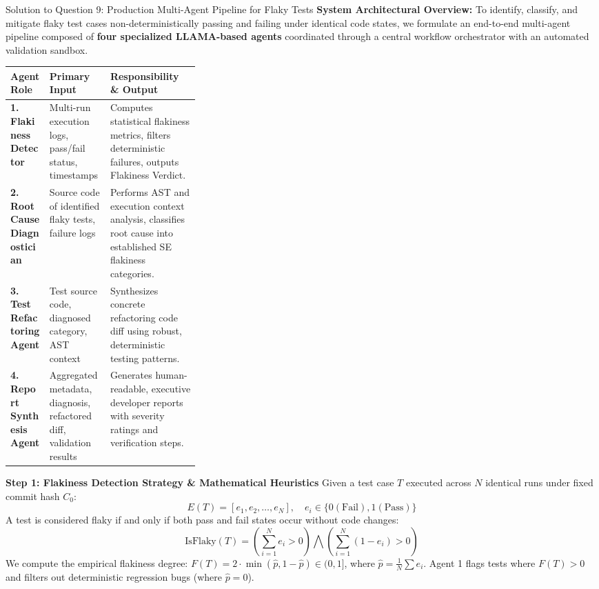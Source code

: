 \documentclass[11pt,a4paper]{article}
\begin{document}
\begin{solutionbox}{Solution to Question 9: Production Multi-Agent Pipeline for Flaky Tests}
\textbf{System Architectural Overview:}
To identify, classify, and mitigate flaky test cases non-deterministically passing and failing under identical code states, we formulate an end-to-end multi-agent pipeline composed of \textbf{four specialized LLAMA-based agents} coordinated through a central workflow orchestrator with an automated validation sandbox.

\begin{center}
\small
\begin{tabularx}{\linewidth}{l >{\raggedright\arraybackslash}p{0.32\linewidth} >{\raggedright\arraybackslash}X}
\toprule
\textbf{Agent Role} & \textbf{Primary Input} & \textbf{Responsibility \& Output} \\
\midrule
\textbf{1. Flakiness Detector} & Multi-run execution logs, pass/fail status, timestamps & Computes statistical flakiness metrics, filters deterministic failures, outputs Flakiness Verdict. \\
\textbf{2. Root Cause Diagnostician} & Source code of identified flaky tests, failure logs & Performs AST and execution context analysis, classifies root cause into established SE flakiness categories. \\
\textbf{3. Test Refactoring Agent} & Test source code, diagnosed category, AST context & Synthesizes concrete refactoring code diff using robust, deterministic testing patterns. \\
\textbf{4. Report Synthesis Agent} & Aggregated metadata, diagnosis, refactored diff, validation results & Generates human-readable, executive developer reports with severity ratings and verification steps. \\
\bottomrule
\end{tabularx}
\end{center}

\medskip
\noindent
\textbf{Step 1: Flakiness Detection Strategy \& Mathematical Heuristics}
Given a test case $T$ executed across $N$ identical runs under fixed commit hash $C_0$:
\begin{equation*}
    E(T) = [e_1, e_2, \dots, e_N], \quad e_i \in \{0 (\text{Fail}), 1 (\text{Pass})\}
\end{equation*}
A test is considered flaky if and only if both pass and fail states occur without code changes:
\begin{equation*}
    \text{IsFlaky}(T) = \left( \sum_{i=1}^N e_i > 0 \right) \bigwedge \left( \sum_{i=1}^N (1 - e_i) > 0 \right)
\end{equation*}
We compute the empirical flakiness degree: $F(T) = 2 \cdot \min\left( \hat{p}, 1 - \hat{p} \right) \in (0, 1]$, where $\hat{p} = \frac{1}{N} \sum e_i$.
Agent 1 flags tests where $F(T) > 0$ and filters out deterministic regression bugs (where $\hat{p} = 0$).


\end{solutionbox}
\end{document}

